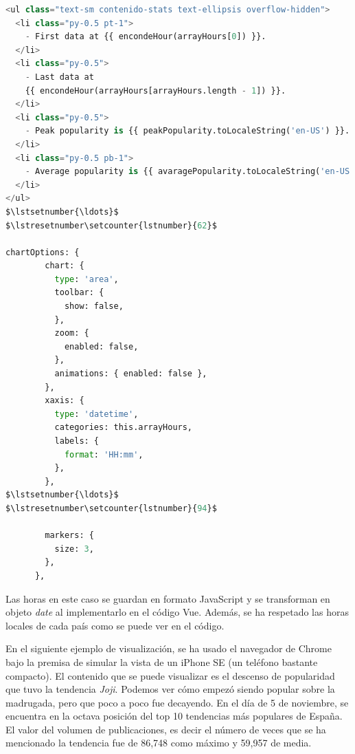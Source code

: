 \begin{lstlisting}[caption=Diferencias destacables de la implementación de la popularidad,language=Python, mathescape=true]
<ul class="text-sm contenido-stats text-ellipsis overflow-hidden">
  <li class="py-0.5 pt-1">
    - First data at {{ encondeHour(arrayHours[0]) }}.
  </li>
  <li class="py-0.5">
    - Last data at
    {{ encondeHour(arrayHours[arrayHours.length - 1]) }}.
  </li>
  <li class="py-0.5">
    - Peak popularity is {{ peakPopularity.toLocaleString('en-US') }}.
  </li>
  <li class="py-0.5 pb-1">
    - Average popularity is {{ avaragePopularity.toLocaleString('en-US') }}.
  </li>
</ul>
$\lstsetnumber{\ldots}$
$\lstresetnumber\setcounter{lstnumber}{62}$

chartOptions: {
        chart: {
          type: 'area',
          toolbar: {
            show: false,
          },
          zoom: {
            enabled: false,
          },
          animations: { enabled: false },
        },
        xaxis: {
          type: 'datetime',
          categories: this.arrayHours,
          labels: {
            format: 'HH:mm',
          },
        },
$\lstsetnumber{\ldots}$
$\lstresetnumber\setcounter{lstnumber}{94}$

        markers: {
          size: 3,
        },
      },
\end{lstlisting}

Las horas en este caso se guardan en formato JavaScript y se transforman en objeto \textit{date} al implementarlo en el código Vue. Además, se ha respetado las horas locales de cada país como se puede ver en el código.

\vspace{0.3cm}

En el siguiente ejemplo de visualización, se ha usado el navegador de Chrome bajo la premisa de simular la vista de un iPhone SE (un teléfono bastante compacto). El contenido que se puede visualizar es el descenso de popularidad que tuvo la tendencia \textit{Joji}. Podemos ver cómo empezó siendo popular sobre la madrugada, pero que poco a poco fue decayendo. En el día de 5 de noviembre, se encuentra en la octava posición del top 10 tendencias más populares de España. El valor del volumen de publicaciones, es decir el número de veces que se ha mencionado la tendencia fue de 86,748 como máximo y 59,957 de media.

